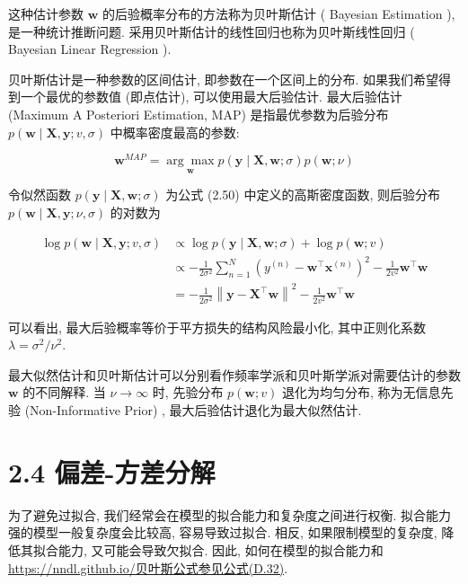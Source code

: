 \documentclass[10pt]{article}
\begin{document}
这种估计参数 $\boldsymbol{w}$ 的后验概率分布的方法称为贝叶斯估计 ( Bayesian Estimation ), 是一种统计推断问题. 采用贝叶斯估计的线性回归也称为贝叶斯线性回归 ( Bayesian Linear Regression ).

贝叶斯估计是一种参数的区间估计, 即参数在一个区间上的分布. 如果我们希望得到一个最优的参数值 (即点估计), 可以使用最大后验估计. 最大后验估计 (Maximum A Posteriori Estimation, MAP) 是指最优参数为后验分布 $p(\boldsymbol{w} \mid \boldsymbol{X}, \boldsymbol{y} ; v, \sigma)$ 中概率密度最高的参数:


\begin{equation*}
\boldsymbol{w}^{M A P}=\underset{\boldsymbol{w}}{\arg \max } p(\boldsymbol{y} \mid \boldsymbol{X}, \boldsymbol{w} ; \sigma) p(\boldsymbol{w} ; \nu) \tag{2.56}
\end{equation*}


令似然函数 $p(\boldsymbol{y} \mid \boldsymbol{X}, \boldsymbol{w} ; \sigma)$ 为公式 (2.50) 中定义的高斯密度函数, 则后验分布 $p(\boldsymbol{w} \mid \boldsymbol{X}, \boldsymbol{y} ; \nu, \sigma)$ 的对数为


\begin{align*}
\log p(\boldsymbol{w} \mid \boldsymbol{X}, \boldsymbol{y} ; v, \sigma) & \propto \log p(\boldsymbol{y} \mid \boldsymbol{X}, \boldsymbol{w} ; \sigma)+\log p(\boldsymbol{w} ; v)  \tag{2.57}\\
& \propto-\frac{1}{2 \sigma^{2}} \sum_{n=1}^{N}\left(y^{(n)}-\boldsymbol{w}^{\top} \boldsymbol{x}^{(n)}\right)^{2}-\frac{1}{2 v^{2}} \boldsymbol{w}^{\top} \boldsymbol{w}  \tag{2.58}\\
& =-\frac{1}{2 \sigma^{2}}\left\|\boldsymbol{y}-\boldsymbol{X}^{\top} \boldsymbol{w}\right\|^{2}-\frac{1}{2 v^{2}} \boldsymbol{w}^{\top} \boldsymbol{w} \tag{2.59}
\end{align*}


可以看出, 最大后验概率等价于平方损失的结构风险最小化, 其中正则化系数 $\lambda=\sigma^{2} / \nu^{2}$.

最大似然估计和贝叶斯估计可以分别看作频率学派和贝叶斯学派对需要估计的参数 $\boldsymbol{w}$ 的不同解释. 当 $\nu \rightarrow \infty$ 时, 先验分布 $p(\boldsymbol{w} ; v)$ 退化为均匀分布, 称为无信息先验 (Non-Informative Prior) , 最大后验估计退化为最大似然估计.

\section*{2.4 偏差-方差分解}
为了避免过拟合, 我们经常会在模型的拟合能力和复杂度之间进行权衡. 拟合能力强的模型一般复杂度会比较高, 容易导致过拟合. 相反, 如果限制模型的复杂度, 降低其拟合能力, 又可能会导致欠拟合. 因此, 如何在模型的拟合能力和 \href{https://nndl.github.io/%E8%B4%9D%E5%8F%B6%E6%96%AF%E5%85%AC%E5%BC%8F%E5%8F%82%E8%A7%81%E5%85%AC%E5%BC%8F(D.32)}{https://nndl.github.io/贝叶斯公式参见公式(D.32)}.
\end{document}
